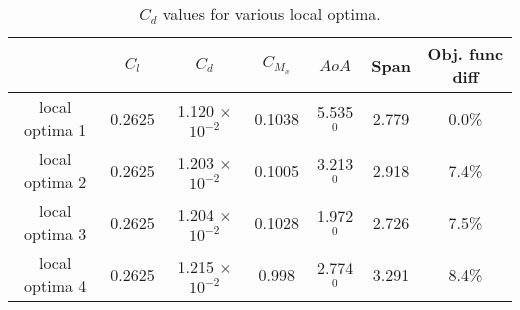 \begin{table}[!htbp]
    \centering
    \begin{tabular}{|c|c|c|c|c|c|c|}\hline
          & $C_l$ & $C_d$ & $C_{M_x}$ & $AoA$ & Span & Obj. func diff \\\hline
        local optima 1 & 0.2625 & 1.120 $\times$ $10^{-2}$ & 0.1038 & 5.535$^0$ & 2.779 & 0.0\%\\
        local optima 2 & 0.2625 & 1.203 $\times$ $10^{-2}$ & 0.1005 & 3.213$^0$ & 2.918 & 7.4\%\\
        local optima 3 & 0.2625 & 1.204 $\times$ $10^{-2}$ & 0.1028 & 1.972$^0$ & 2.726 & 7.5\%\\
        local optima 4 & 0.2625 & 1.215 $\times$ $10^{-2}$ & 0.998  & 2.774$^0$ & 3.291 & 8.4\%\\ \hline
    \end{tabular}
    \caption{$C_d$ values for various local optima.}
    \label{optimal shape}
\end{table}